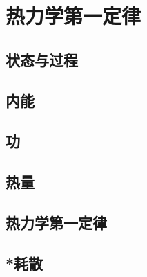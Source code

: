 

\section{热力学第一定律}\label{10-2}

\subsection{状态与过程}\label{10-2-1}

\subsection{内能}\label{10-2-2}

\subsection{功}\label{10-2-3}

\subsection{热量}\label{10-2-4}

\subsection{热力学第一定律}\label{10-2-5}

\subsection{*耗散}\label{10-2-6}